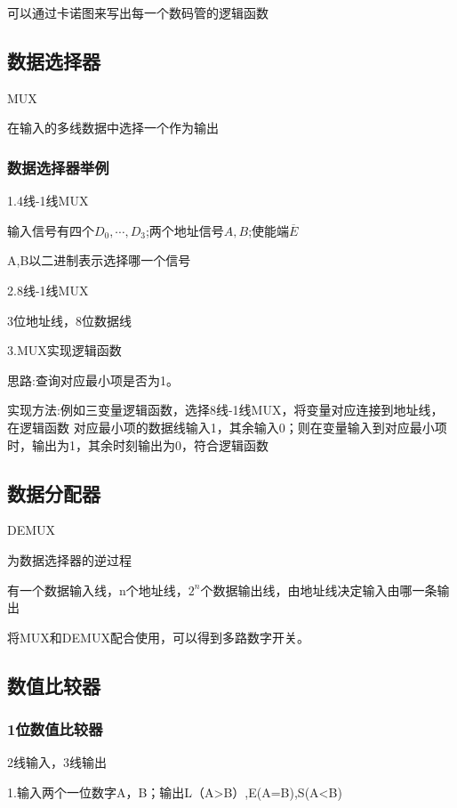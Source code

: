 \documentclass[11pt,twoside,a4paper]{ctexart}
\begin{document}
    可以通过卡诺图来写出每一个数码管的逻辑函数

    \subsection{数据选择器}

    MUX

    在输入的多线数据中选择一个作为输出

    \subsubsection{数据选择器举例}

    1.4线-1线MUX

    输入信号有四个$D_0,\cdots,D_3$;两个地址信号$A,B$;使能端$\overline{E}$

    A,B以二进制表示选择哪一个信号

    2.8线-1线MUX

    3位地址线，8位数据线

    3.MUX实现逻辑函数

    思路:查询对应最小项是否为1。

    实现方法:例如三变量逻辑函数，选择8线-1线MUX，将变量对应连接到地址线，在逻辑函数
    对应最小项的数据线输入1，其余输入0；则在变量输入到对应最小项时，输出为1，其余时刻输出为0，符合逻辑函数

    \subsection{数据分配器}

    DEMUX

    为数据选择器的逆过程

    有一个数据输入线，n个地址线，$2^n$个数据输出线，由地址线决定输入由哪一条输出

    将MUX和DEMUX配合使用，可以得到多路数字开关。

    \subsection{数值比较器}

    \subsubsection{1位数值比较器}

    2线输入，3线输出

    1.输入两个一位数字A，B；输出L（A>B）,E(A=B),S(A<B)
\end{document}
